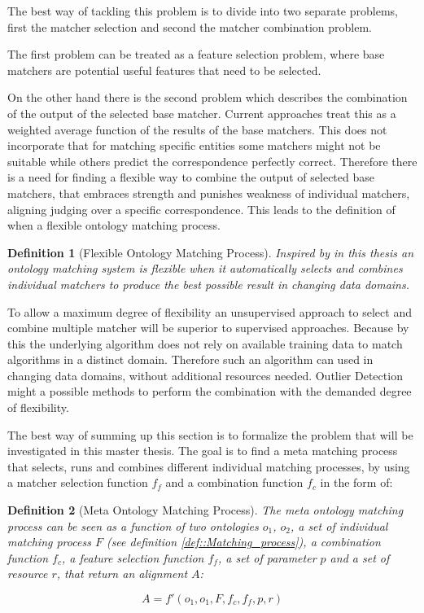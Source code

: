 \documentclass[11pt,titlepage,oneside,openany,a4paper]{report}
\newtheorem{definition}{Definition}[chapter]
\begin{document}
The best way of tackling this problem is to divide into two separate problems, first the matcher selection and second the matcher combination problem.

The first problem can be treated as a feature selection problem, where base matchers are potential useful features that need to be selected. 

On the other hand there is the second problem which describes the combination of the output of the selected base matcher. Current approaches treat this as a weighted average function of the results of the base matchers. This does not incorporate that for matching specific entities some matchers might not be suitable while others predict the correspondence perfectly correct. Therefore there is a need for finding a flexible way to combine the output of selected base matchers, that embraces strength and punishes weakness of individual matchers, aligning judging over a specific correspondence. This leads to the definition of when a flexible ontology matching process.

\begin{definition}[Flexible Ontology  Matching Process]
Inspired by \cite{Ngo:2012aa} in this thesis an ontology matching system is flexible when it automatically selects and combines individual matchers to produce the best possible result in changing data domains.
\end{definition}

To allow a maximum degree of flexibility an unsupervised approach to select and combine multiple matcher will be superior to supervised approaches. Because by this the underlying algorithm does not rely on available training data to match algorithms in a distinct domain. Therefore such an algorithm can used in changing data domains, without additional resources needed. Outlier Detection might a possible methods to perform the combination with the demanded degree of flexibility. 

The best way of summing up this section is to formalize the problem that will be investigated in this master thesis. The goal is to find a meta matching process that selects, runs and combines different individual matching processes, by using a matcher selection function $f_f$ and a combination function $f_c$ in the form of:
\begin{definition}[Meta Ontology Matching Process]
The meta ontology matching process can be seen as a function  of two ontologies $o_1$, $o_2$, a set of individual matching process $F$ (see definition \ref{def::Matching_process}), a combination function $f_c$, a feature selection function $f_f$, a set of parameter $p$ and a set of resource $r$, that return an alignment $A$:

\begin{equation*}
A = f' (o_1,o_1,F, f_c,f_f, p,r)
\end{equation*}
\end{definition}
\end{document}
